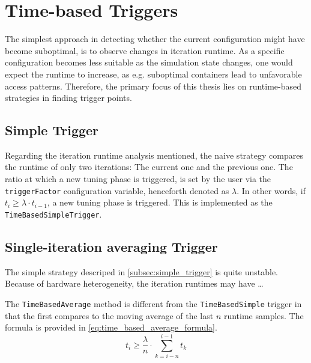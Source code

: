 \section{Time-based Triggers}

The simplest approach in detecting whether the current configuration might have become suboptimal, is to observe changes in iteration runtime. As a specific configuration becomes less suitable as the simulation state changes, one would expect the runtime to increase, as e.g. suboptimal containers lead to unfavorable access patterns. Therefore, the primary focus of this thesis lies on runtime-based strategies in finding trigger points.

\subsection{Simple Trigger}
\label{subsec:simple_trigger}
Regarding the iteration runtime analysis mentioned, the naive strategy compares the runtime of only two iterations: The current one and the previous one. The ratio at which a new tuning phase is triggered, is set by the user via the \texttt{triggerFactor} configuration variable, henceforth denoted as $\lambda$. In other words, if $t_i \ge \lambda\cdot t_{i-1}$, a new tuning phase is triggered. This is implemented as the \texttt{TimeBasedSimpleTrigger}.


\subsection{Single-iteration averaging Trigger}
The simple strategy descriped in \autoref{subsec:simple_trigger} is quite unstable. Because of hardware heterogeneity, the iteration runtimes may have …\textellipsis %

The \texttt{TimeBasedAverage} method is different from the \texttt{TimeBasedSimple} trigger in that the first compares to the  moving average of the last $n$ runtime samples. The formula is provided in \eqref{eq:time_based_average_formula}.
\begin{equation}
	t_i \ge \frac{\lambda}{n}\cdot \sum_{k=i-n}^{i-1}t_{k}\label{eq:time_based_average_formula}
\end{equation}


